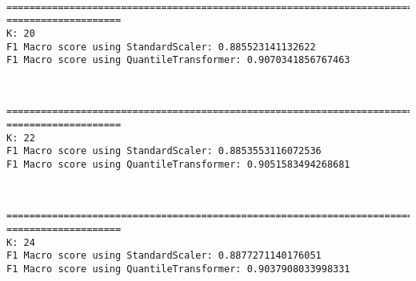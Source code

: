 \documentclass[11pt]{article}
\begin{document}
    \begin{center}
    \end{center}
    { \hspace*{\fill} \\}
    
    \begin{Verbatim}[commandchars=\\\{\}]
================================================================================
====================
K: 20
F1 Macro score using StandardScaler: 0.885523141132622
F1 Macro score using QuantileTransformer: 0.9070341856767463
    \end{Verbatim}

    \begin{center}
    \end{center}
    { \hspace*{\fill} \\}
    
    \begin{Verbatim}[commandchars=\\\{\}]
================================================================================
====================
K: 22
F1 Macro score using StandardScaler: 0.8853553116072536
F1 Macro score using QuantileTransformer: 0.9051583494268681
    \end{Verbatim}

    \begin{center}
    \end{center}
    { \hspace*{\fill} \\}
    
    \begin{Verbatim}[commandchars=\\\{\}]
================================================================================
====================
K: 24
F1 Macro score using StandardScaler: 0.8877271140176051
F1 Macro score using QuantileTransformer: 0.9037908033998331
    \end{Verbatim}

    \begin{center}
    \end{center}
    { \hspace*{\fill} \\}
    
\end{document}
